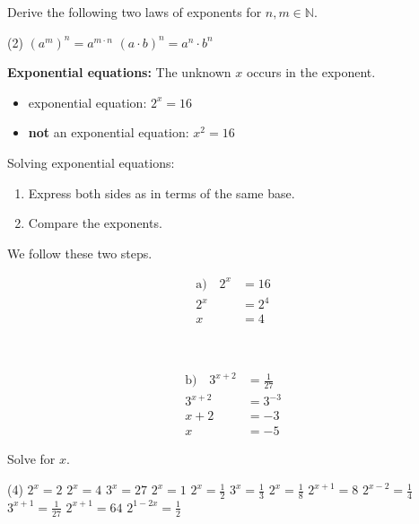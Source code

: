 \begin{exercise}
	Derive the following two laws of exponents for $n,m\in\mathbb N$.
	\begin{tasks}(2)
		\task $\left(a^m\right)^n=a^{m\cdot n}$
		\task $\left(a\cdot b\right)^n=a^n\cdot b^n$
	\end{tasks}
\end{exercise}
\begin{tcolorbox}
	\textbf{Exponential equations:} The unknown $x$ occurs in the exponent.
	\begin{itemize}
		\item exponential equation: $2^x=16$
		\item \textbf{not} an exponential equation: $x^2=16$
	\end{itemize}
	Solving exponential equations:
	\begin{enumerate}[Step 1:]
		\item Express both sides as in terms of the same base.
		\item Compare the exponents.
	\end{enumerate}
\end{tcolorbox}
\begin{example}
	We follow these two steps.\\
	\begin{minipage}{0.45\textwidth}
		\begin{align*}
			\textrm{a)}\quad 2^x&=16 \\
			2^x&=2^4 \\
			x&=4 \\
			\phantom{x+2}& \\
			\phantom{x+2}&
		\end{align*}
	\end{minipage}\hfill
	\begin{minipage}{0.45\textwidth}
		\begin{align*}
			\textrm{b)}\quad 3^{x+2}&=\frac{1}{27} \\
			3^{x+2}&=3^{-3} \\
			x+2&=-3 \\
			x&=-5
		\end{align*}
	\end{minipage}
\end{example}
\begin{exercise}
	Solve for $x$.
	\begin{tasks}(4)
		\task $2^x=2$ \task $2^x=4$ \task $3^x=27$ \task $2^x=1$
		\task $2^x=\frac{1}{2}$ \task $3^x=\frac{1}{3}$ \task $2^x=\frac{1}{8}$ \task $2^{x+1}=8$
		\task $2^{x-2}=\frac{1}{4}$ \task $3^{x+1}=\frac{1}{27}$ \task $2^{x+1}=64$
		\task $2^{1-2x}=\frac{1}{2}$
	\end{tasks}
\end{exercise}
